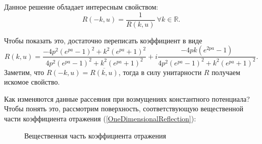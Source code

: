 \documentclass[a4 paper, 12 pt]{extarticle}
\begin{document}
   Данное решение обладает интересным свойством: \[R\left(-k,u\right) = \frac{1}{R\left(k,u\right)} \ \forall k \in \mathbb{R}.\]
   
   Чтобы показать это, достаточно переписать коэффициент в виде
   \[ R\left(k,u\right) =
   \frac{-4p^2 \left(e^{pa}-1\right)^2 + k^2 \left(e^{pa}+1\right)^2}{4p^2 \left(e^{pa}-1\right)^2 + k^2 \left(e^{pa}+1\right)^2} + i \frac{-4pk\left(e^{2pa}-1\right)}{4p^2 \left(e^{pa}-1\right)^2 + k^2 \left(e^{pa}+1\right)^2}.\]
   Заметим, что $R\left(-k,u\right) = \overline{R\left(k,u\right)}$, тогда в силу унитарности $R$ получаем искомое свойство.  
   
   Как изменяются данные рассеяния при возмущениях константного потенциала?
   Чтобы понять это, рассмотрим поверхность, соответствующую вещественной части коэффициента отражения (\ref{OneDimensionalReflection}):
   
   \begin{figure}[!htb]
   	\begin{minipage}[h]{0.49\linewidth}
   	\end{minipage}
      	\begin{minipage}[h]{0.49\linewidth}
   \end{minipage}
   \caption{Вещественная часть коэффициента отражения}
   \label{fig:real}
   \end{figure}
   
\end{document}
